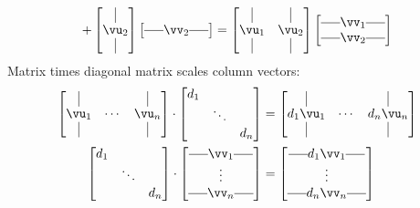\documentclass[a4paper,11pt]{exam}
\newcounter{ct}
\newcommand{\horzbar}{\rule[.5ex]{1.5em}{0.4pt}}
\begin{document}
\begin{questions}
\begin{tcolorbox}[colback=black!1!,title=Matrix Fun Facts]
\begin{align}
    +
    \begin{bmatrix}
	\kern.3em\vline\kern.3em \\
	\vu_2 \\
	\kern.3em\vline\kern.3em
    \end{bmatrix}
    \begin{bmatrix}
	\horzbar \vv_2 \horzbar
    \end{bmatrix}
    =
    \begin{bmatrix}
	\kern.3em\vline\kern.3em
	&
	\kern.3em\vline\kern.3em
	\\
	\vu_1 & \vu_2 \\
	\kern.3em\vline\kern.3em
	&
	\kern.3em\vline\kern.3em
    \end{bmatrix}
    \begin{bmatrix}
	\horzbar \vv_1 \horzbar \\
	\horzbar \vv_2 \horzbar
    \end{bmatrix}
\end{align}
%
Matrix times diagonal matrix scales column vectors:
\begin{align}
    \begin{bmatrix}
	\kern.3em\vline\kern.3em
	&
	&
	\kern.3em\vline\kern.3em
	\\
	\vu_1 & \cdots & \vu_n \\
	\kern.3em\vline\kern.3em
	&
	&
	\kern.3em\vline\kern.3em
    \end{bmatrix}
    \cdot
    \begin{bmatrix}
	d_1 & & \\
	    & \ddots & \\
	    & & d_n
    \end{bmatrix}
    &=
    \begin{bmatrix}
	\kern.3em\vline\kern.3em
	&
	&
	\kern.3em\vline\kern.3em
	\\
	d_1 \vu_1 & \cdots & d_n \vu_n \\
	\kern.3em\vline\kern.3em
	&
	&
	\kern.3em\vline\kern.3em
    \end{bmatrix}
    \\
    \begin{bmatrix}
	d_1 & & \\
	    & \ddots & \\
	    & & d_n
    \end{bmatrix}
    \cdot
    \begin{bmatrix}
	\horzbar \vv_1 \horzbar \\
	\vdots \\
	\horzbar \vv_n \horzbar
    \end{bmatrix}
    &=
    \begin{bmatrix}
	\horzbar d_1 \vv_1 \horzbar \\
	\vdots \\
	\horzbar d_n \vv_n \horzbar
    \end{bmatrix}
\end{align}
\end{tcolorbox}


\end{questions}
\end{document}
